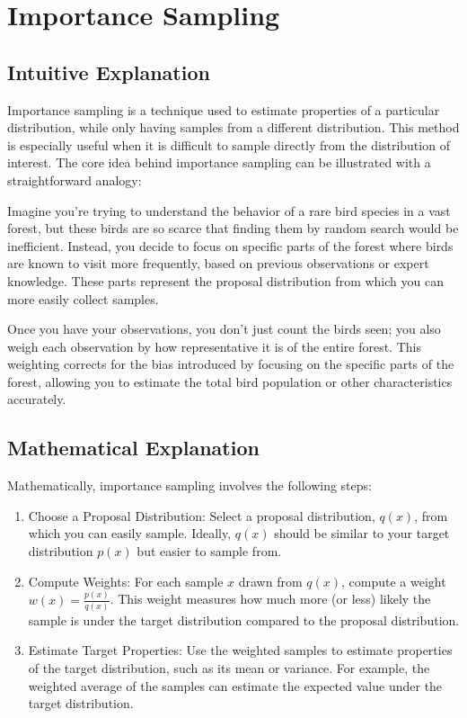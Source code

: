 \documentclass{article}
\begin{document}
\section{Importance Sampling}
\subsection{Intuitive Explanation}
Importance sampling is a technique used to estimate properties of a particular distribution, while only having samples from a different distribution. This method is especially useful when it is difficult to sample directly from the distribution of interest. The core idea behind importance sampling can be illustrated with a straightforward analogy:

Imagine you're trying to understand the behavior of a rare bird species in a vast forest, but these birds are so scarce that finding them by random search would be inefficient. Instead, you decide to focus on specific parts of the forest where birds are known to visit more frequently, based on previous observations or expert knowledge. These parts represent the proposal distribution from which you can more easily collect samples.

Once you have your observations, you don't just count the birds seen; you also weigh each observation by how representative it is of the entire forest. This weighting corrects for the bias introduced by focusing on the specific parts of the forest, allowing you to estimate the total bird population or other characteristics accurately.

\subsection{Mathematical Explanation}
Mathematically, importance sampling involves the following steps:
\begin{enumerate}
    \item Choose a Proposal Distribution: Select a proposal distribution, $q(x)$, from which you can easily sample. Ideally, $q(x)$ should be similar to your target distribution $p(x)$ but easier to sample from.
    \item Compute Weights: For each sample $x$ drawn from $q(x)$, compute a weight $w(x) = \frac{p(x)}{q(x)}$. This weight measures how much more (or less) likely the sample is under the target distribution compared to the proposal distribution.
    \item Estimate Target Properties: Use the weighted samples to estimate properties of the target distribution, such as its mean or variance. For example, the weighted average of the samples can estimate the expected value under the target distribution.
\end{enumerate}
\end{document}
